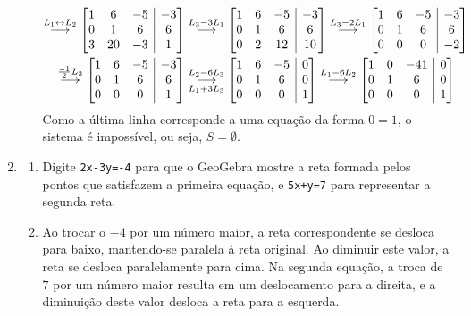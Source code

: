 \documentclass[12pt,a4paper]{article}
\makeatletter
\newenvironment{amatrix}[1]{%
  \left[\begin{array}{@{}*{#1}{c}|c@{}}
}{%
  \end{array}\right]
}
\newcommand{\grstep}[2][\relax]{%
   \ensuremath{\mathrel{
       {\mathop{\longrightarrow}\limits^{#2\mathstrut}_{
                                     \begin{subarray}{l} #1 \end{subarray}}}}}}
\makeatother
\begin{document}
\begin{enumerate}
\begin{enumerate}
\begin{align*}
[A|B]
\grstep{ L_1 \leftrightarrow L_2 }
\begin{amatrix}{3}
   1 &  6 & -5 & -3 \\
   0 &  1 &  6 &  6 \\
   3 & 20 & -3 &  1
\end{amatrix}
&
\grstep{ L_3 - 3 L_1 }
\begin{amatrix}{3}
   1 & 6 & -5 & -3 \\
   0 & 1 &  6 &  6 \\
   0 & 2 & 12 & 10
\end{amatrix}
\grstep{ L_3 - 2 L_1 }
\begin{amatrix}{3}
   1 & 6 & -5 & -3 \\
   0 & 1 &  6 &  6 \\
   0 & 0 &  0 & -2
\end{amatrix} \\
\grstep{ \frac{-1}{2} L_3 }
\begin{amatrix}{3}
   1 & 6 & -5 & -3 \\
   0 & 1 &  6 &  6 \\
   0 & 0 &  0 & 1
\end{amatrix}
&
\grstep[ L_1 + 3 L_3 ]{ L_2 - 6 L_3 }
\begin{amatrix}{3}
   1 & 6 & -5 & 0 \\
   0 & 1 &  6 & 0 \\
   0 & 0 &  0 & 1
\end{amatrix}
\grstep{ L_1 - 6 L_2 }
\begin{amatrix}{3}
   1 & 0 & -41 & 0 \\
   0 & 1 &  6 & 0 \\
   0 & 0 &  0 & 1
\end{amatrix}
\end{align*}
Como a última linha corresponde a uma equação da forma $0 = 1$, o sistema é impossível, ou seja, $S = \emptyset$.
\end{enumerate}

\item \begin{enumerate}
\item Digite \texttt{2x-3y=-4} para que o GeoGebra mostre a reta formada pelos pontos que satisfazem a primeira equação, e \texttt{5x+y=7} para representar a segunda reta.
\item Ao trocar o $-4$ por um número maior, a reta correspondente se desloca para baixo, mantendo-se paralela à reta original. Ao diminuir este valor, a reta se desloca paralelamente para cima. Na segunda equação, a troca de $7$ por um número maior resulta em um deslocamento para a direita, e a diminuição deste valor desloca a reta para a esquerda.


\end{enumerate}
\end{enumerate}
\end{document}
